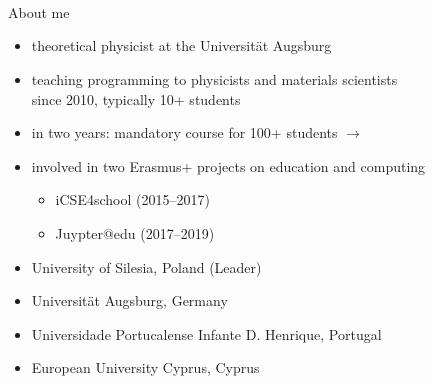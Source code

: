 \documentclass[svgnames]{beamer}
\begin{document}
\begin{frame}[t]
 \vspace{1.5truecm}
 \begin{center}
  \\[0.2truecm]
  \\[0.8truecm]
  \\[0.1truecm]
 \end{center}
\end{frame}

\begin{frame}{About me}
 \begin{itemize}
  \item theoretical physicist at the Universität Augsburg
  \item teaching programming to physicists and materials scientists\\
	since 2010, typically 10+ students
  \item in two years: mandatory course for 100+ students $\rightarrow$
  \item involved in two Erasmus+ projects on education and computing
	\begin{itemize}
         \item iCSE4school (2015--2017)
	 \item Juypter@edu (2017--2019)
	\end{itemize}
 \end{itemize}

 \vspace{0.8truecm}
 \hspace{4.7truecm}%

 \vspace{-0.7truecm}
 \begin{itemize}
  \item University of Silesia, Poland (Leader)
  \item Universität Augsburg, Germany
  \item Universidade Portucalense Infante D. Henrique, Portugal
  \item European University Cyprus, Cyprus
 \end{itemize}
\end{frame}
\end{document}

